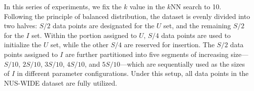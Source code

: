  In this series of experiments, we fix the $k$ value in the $k$NN search to 10. Following the principle of balanced distribution, the dataset is evenly divided into two halves: $S/2$ data points are designated for the $U$ set, and the remaining $S/2$ for the $I$ set. Within the portion assigned to $U$, $S/4$ data points are used to initialize the $U$ set, while the other $S/4$ are reserved for insertion. The $S/2$ data points assigned to $I$ are further partitioned into five segments of increasing size—$S/10$, $2S/10$, $3S/10$, $4S/10$, and $5S/10$—which are sequentially used as the sizes of $I$ in different parameter configurations. Under this setup, all data points in the NUS-WIDE dataset are fully utilized.

